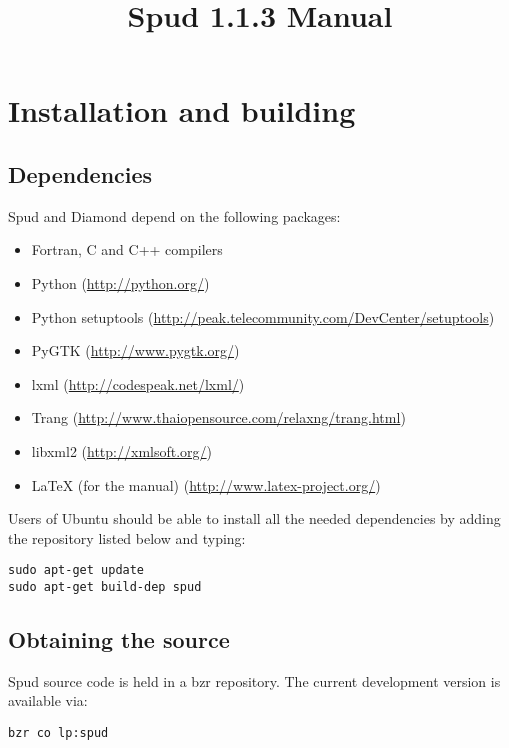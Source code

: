 \documentclass[a4paper, 11pt]{book}
\title{Spud 1.1.3 Manual}
\begin{document}
\maketitle

\tableofcontents


\chapter{Installation and building}

\section{Dependencies}

Spud and Diamond depend on the following packages:

\begin{itemize}
\item Fortran, C and C++ compilers
\item Python (\url{http://python.org/})
\item Python setuptools (\url{http://peak.telecommunity.com/DevCenter/setuptools})
\item PyGTK (\url{http://www.pygtk.org/})
\item lxml (\url{http://codespeak.net/lxml/})
\item Trang (\url{http://www.thaiopensource.com/relaxng/trang.html})
\item libxml2 (\url{http://xmlsoft.org/})
\item LaTeX (for the manual) (\url{http://www.latex-project.org/})
\end{itemize}

Users of Ubuntu should
be able to install all the needed dependencies by adding the repository listed below and typing:

\begin{verbatim}
sudo apt-get update
sudo apt-get build-dep spud
\end{verbatim}

\section{Obtaining the source}

Spud source code is held in a bzr repository. The current development version is available via:

\begin{verbatim}
bzr co lp:spud
\end{verbatim}
\end{document}
